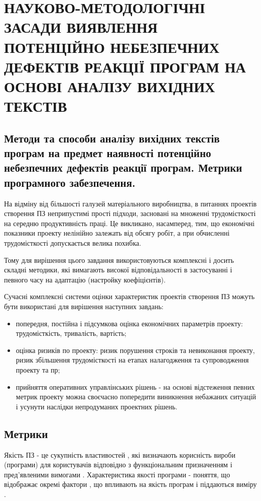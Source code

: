 \chapter{НАУКОВО-МЕТОДОЛОГІЧНІ ЗАСАДИ ВИЯВЛЕННЯ ПОТЕНЦІЙНО НЕБЕЗПЕЧНИХ ДЕФЕКТІВ РЕАКЦІЇ ПРОГРАМ НА ОСНОВІ АНАЛІЗУ ВИХІДНИХ ТЕКСТІВ}
\label{2section::doc}\label{2section:id1}

\section{Методи та способи аналізу вихідних текстів програм на предмет наявності потенційно небезпечних дефектів реакції програм. Метрики програмного забезпечення.}
\label{2section:id2}
На відміну від більшості галузей матеріального виробництва, в питаннях проектів створення ПЗ неприпустимі прості підходи, засновані на множенні трудомісткості на середню продуктивність праці. Це викликано, насамперед, тим, що економічні показники проекту нелінійно залежать від обсягу робіт, а при обчисленні трудомісткості допускається велика похибка.

Тому для вирішення цього завдання використовуються комплексні і досить складні методики, які вимагають високої відповідальності в застосуванні і певного часу на адаптацію (настройку коефіцієнтів).

Сучасні комплексні системи оцінки характеристик проектів створення ПЗ можуть бути використані для вирішення наступних завдань:
\begin{itemize}
\item {} 
попередня, постійна і підсумкова оцінка економічних параметрів проекту: трудомісткість, тривалість, вартість;

\item {} 
оцінка ризиків по проекту: ризик порушення строків та невиконання проекту, ризик збільшення трудомісткості на етапах налагодження та супроводження проекту та пр;

\item {} 
прийняття оперативних управлінських рішень - на основі відстеження певних метрик проекту можна своєчасно попередити виникнення небажаних ситуацій і усунути наслідки непродуманих проектних рішень.

\end{itemize}


\section{Метрики}
\label{2section:id3}
Якість ПЗ - це сукупність властивостей , які визначають корисність вироби (програми) для користувачів відповідно з функціональним призначенням і пред'явленими вимогами .
Характеристика якості програми - поняття, що відображає окремі фактори , що впливають на якість програм і піддаються виміру .

